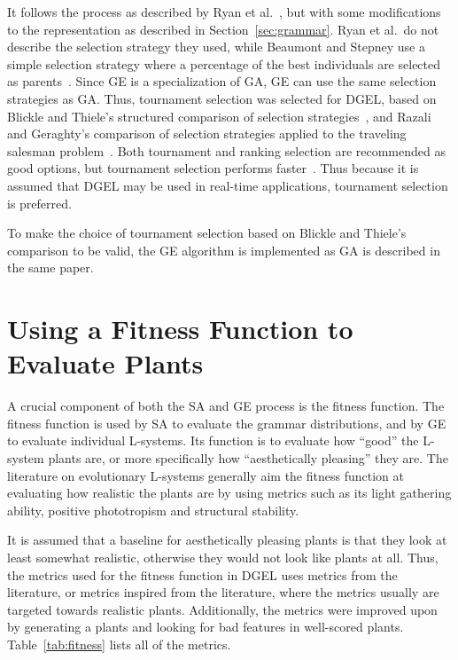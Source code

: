 It follows the process as described by Ryan et al.~\cite{1998Ryan}, but with some modifications to the representation as described in Section~\ref{sec:grammar}.
Ryan et al.\ do not describe the selection strategy they used, while Beaumont and Stepney use a simple selection strategy where a percentage of the best individuals are selected as parents~\cite{2009Beaumont}.
Since GE is a specialization of GA, GE can use the same selection strategies as GA.
Thus, tournament selection was selected for DGEL, based on Blickle and Thiele's structured comparison of selection strategies~\cite{1995Blickle}, and Razali and Geraghty's comparison of selection strategies applied to the traveling salesman problem~\cite{2011Razali}.
Both tournament and ranking selection are recommended as good options, but tournament selection performs faster~\cite{1995Blickle}.
Thus because it is assumed that DGEL may be used in real-time applications, tournament selection is preferred.

To make the choice of tournament selection based on Blickle and Thiele's comparison to be valid, the GE algorithm is implemented as GA is described in the same paper.

\section{Using a Fitness Function to Evaluate Plants}
A crucial component of both the SA and GE process is the fitness function.
The fitness function is used by SA to evaluate the grammar distributions, and by GE to evaluate individual L-systems.
Its function is to evaluate how ``good'' the L-system plants are, or more specifically how ``aesthetically pleasing'' they are.
The literature on evolutionary L-systems generally aim the fitness function at evaluating how realistic the plants are by using metrics such as its light gathering ability, positive phototropism and structural stability.

It is assumed that a baseline for aesthetically pleasing plants is that they look at least somewhat realistic, otherwise they would not look like plants at all.
Thus, the metrics used for the fitness function in DGEL uses metrics from the literature, or metrics inspired from the literature, where the metrics usually are targeted towards realistic plants.
Additionally, the metrics were improved upon by generating a plants and looking for bad features in well-scored plants.
Table~\ref{tab:fitness} lists all of the metrics.

